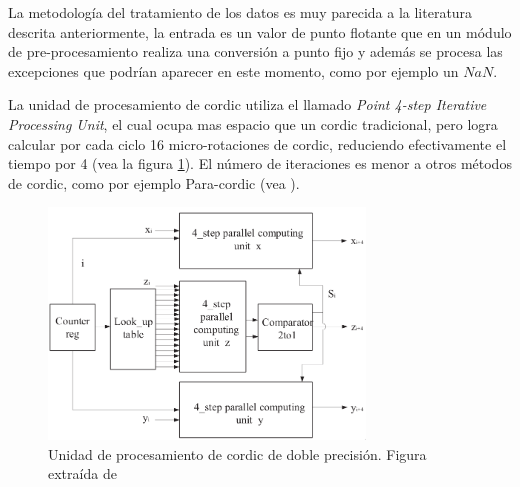 La metodología del tratamiento de los datos es muy parecida a la literatura descrita anteriormente, la entrada es un valor de punto flotante que en un módulo de pre-procesamiento realiza una conversión a punto fijo y además se procesa las excepciones que podrían aparecer en este momento, como por ejemplo un $NaN$.

La unidad de procesamiento de \gls{cordic} utiliza el llamado \textit{Point 4-step Iterative Processing Unit}, el cual ocupa mas espacio que un \gls{cordic} tradicional, pero logra calcular por cada ciclo 16 micro-rotaciones de \gls{cordic}, reduciendo efectivamente el tiempo por 4 (vea la figura \ref{graf:2019_4-step-64bit}). El número de iteraciones es menor a otros métodos de \gls{cordic}, como por ejemplo Para-\gls{cordic} (vea \cite{tso-bing_juang_para-cordic_2004}).

\begin{figure}[ht]
	\centering
	\includegraphics[width=0.75\textwidth]{archivos/CORDIC/2019_4-step-64bit.png}
	\caption{Unidad de procesamiento de \gls{cordic} de doble precisión. Figura extraída de \cite{yeshwanth_high-speed_2018}}
	\label{graf:2019_4-step-64bit}
\end{figure}

\begin{table}[]
	\centering
	\caption{Número de iteraciones comparando el multiplicador \gls{cordic} con punto flotante de \cite{yeshwanth_high-speed_2018} a otras soluciones.}
	\label{table:2019_4-step-comp-64bit}
\end{table}


